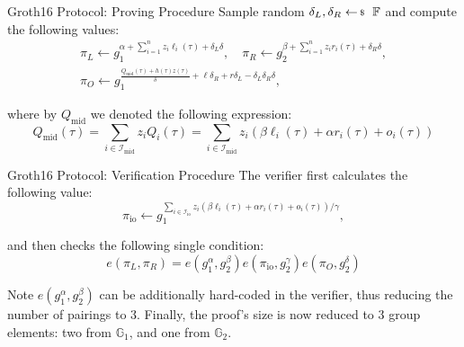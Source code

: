 \documentclass{zkdl-presentation-template}
\begin{document}
    \begin{frame}{Groth16 Protocol: Proving Procedure}
        Sample random $\delta_L,\delta_R \leftarrowS \mathbb{F}$ and compute the following values:
        \begin{gather*}
            \pi_L \gets g_1^{\alpha + \sum_{i=1}^n z_i\ell_i(\tau) + \delta_L\delta}, \quad \pi_R \gets g_2^{\beta + \sum_{i=1}^n z_ir_i(\tau) + \delta_R\delta}, \\ \pi_O \gets g_1^{\frac{Q_{\text{mid}}(\tau)+h(\tau)z(\tau)}{\delta} + \ell\delta_R + r\delta_L - \delta_L\delta_R\delta},
        \end{gather*}
        \pause

        where by $Q_{\text{mid}}$ we denoted the following expression:
        \begin{equation*}
            Q_{\text{mid}}(\tau) = \sum_{i \in \mathcal{I}_{\text{mid}}} z_iQ_i(\tau) = \sum_{i \in \mathcal{I}_{\text{mid}}}z_i(\beta \ell_i(\tau) + \alpha r_i(\tau) + o_i(\tau))
        \end{equation*}
    \end{frame}

    \begin{frame}{Groth16 Protocol: Verification Procedure}
        The verifier first calculates the following value:
        \begin{equation*}
            \pi_{\text{io}} \gets g_1^{\sum_{i \in \mathcal{I}_{\text{io}}}z_i(\beta \ell_i(\tau) + \alpha r_i(\tau) + o_i(\tau))/\gamma},
        \end{equation*}
        \pause

        and then checks the following single condition:
        \begin{equation*}
            e(\pi_L, \pi_R) = e(g_1^{\alpha}, g_2^{\beta})e(\pi_{\text{io}},g_2^{\gamma})e(\pi_O,g_2^{\delta})
        \end{equation*}
        \pause

        \begin{remarkblock}{Note}
            $e(g_1^{\alpha}, g_2^{\beta})$ can be additionally hard-coded in the verifier, thus reducing the number of pairings to 3. Finally, the proof's size is now reduced to 3 group elements: two from $\mathbb{G}_1$, and one from $\mathbb{G}_2$.
        \end{remarkblock}
    \end{frame}

    \makeclosingframe
\end{document}

